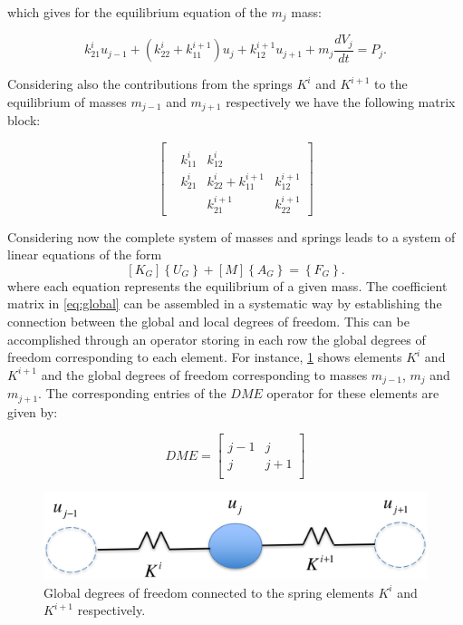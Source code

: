 which gives for the equilibrium equation of the $m_j$ mass:

\[k_{21}^i{u_{j - 1}} + (k_{22}^i + k_{11}^{i + 1}){u_j} + k_{12}^{i + 1}{u_{j + 1}} + {m_j}\frac{{d{V_j}}}{{dt}} = {P_j}.\]

Considering also the contributions from the springs $K^i$ and $K^{i+1}$ to the equilibrium of masses $m_{j-1}$ and $m_{j+1}$ respectively we have the following matrix block:



\[\left[ {\begin{array}{*{20}{c}}
{}&{}&{}&{}\\
{}&{k_{11}^i}&{k_{12}^i}&{}\\
{}&{k_{21}^i}&{k_{22}^i + k_{11}^{i + 1}}&{k_{12}^{i + 1}}\\
{}&{}&{k_{21}^{i + 1}}&{k_{22}^{i + 1}}
\end{array}} \right]\]


Considering now the complete system of masses and springs leads to a system of linear equations of the form
\begin{equation}
\left[ {{K_G}} \right]\left\{ {{U_G}} \right\} + \left[ M \right]\left\{ {{A_G}} \right\} = \left\{ {{F_G}} \right\}.
\label{eq:global}
\end{equation}
where each equation represents the equilibrium of a given mass. The coefficient matrix in \cref{eq:global} can be assembled in a systematic way by establishing the connection between the global and local degrees of freedom. This can be accomplished through an operator storing in each row the global degrees of freedom corresponding to each element. For instance, \cref{fig:IBC} shows elements $K^i$ and $K^{i+1}$ and the global degrees of freedom corresponding to masses $m_{j-1}$, $m_j$ and $m_{j+1}$. The corresponding entries of the $DME$ operator for these elements are given by:


\[DME = \left[ {\begin{array}{*{20}{c}}
{}&{}\\
{j - 1}&j\\
j&{j + 1}\\
{}&{}
\end{array}} \right]\]

\begin{figure}[H]
\centering
\includegraphics[width=12cm]{ibc}
\caption{Global degrees of freedom connected to the spring elements $K^i$ and $K^{i+1}$ respectively.}
\label{fig:IBC}
\end{figure}


